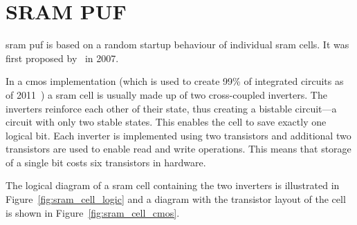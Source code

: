 \chapter{SRAM PUF}\label{sec:sram_puf}

\gls{sram} \gls{puf} is based on a random startup behaviour of individual \gls{sram} cells. It was first proposed by~\cite{Guajardo2007} in 2007.

In a \gls{cmos} implementation (which is used to create 99\% of integrated circuits as of 2011~\cite{Voinigescu2013}) a \gls{sram} cell is usually made up of two cross-coupled inverters. The inverters reinforce each other of their state, thus creating a bistable circuit---a circuit with only two stable states. This enables the cell to save exactly one logical bit. Each inverter is implemented using two transistors and additional two transistors are used to enable read and write operations. This means that storage of a single bit costs six transistors in hardware.~\cite{Maes2010}

The logical diagram of a \gls{sram} cell containing the two inverters is illustrated in Figure~\ref{fig:sram_cell_logic} and a diagram with the transistor layout of the cell is shown in Figure~\ref{fig:sram_cell_cmos}.

